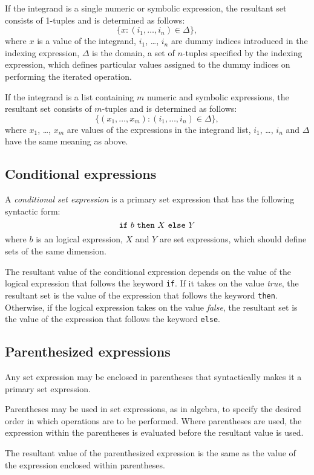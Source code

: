 \documentclass[11pt]{report}
\begin{document}
If the integrand is a single numeric or symbolic expression, the
resultant set consists of 1-tuples and is determined as follows:
$$\{x:(i_1,\dots,i_n)\in\Delta\},$$
\noindent where $x$ is a value of the integrand, $i_1$, \dots, $i_n$
are dummy indices introduced in the indexing expression, $\Delta$ is
the domain, a set of $n$-tuples specified by the indexing expression,
which defines particular values assigned to the dummy indices on
performing the iterated operation.

If the integrand is a list containing $m$ numeric and symbolic
expressions, the resultant set consists of $m$-tuples and is determined
as follows:
$$\{(x_1,\dots,x_m):(i_1,\dots,i_n)\in\Delta\},$$
where $x_1$, \dots, $x_m$ are values of the expressions in the
integrand list, $i_1$, \dots, $i_n$ and $\Delta$ have the same meaning
as above.

\subsection{Conditional expressions}

A {\it conditional set expression} is a primary set expression that has
the following syntactic form:
$$\mbox{{\tt if} $b$ {\tt then} $X$ {\tt else} $Y$}$$
where $b$ is an logical expression, $X$ and $Y$ are set expressions,
which should define sets of the same dimension.

The resultant value of the conditional expression depends on the value
of the logical expression that follows the keyword {\tt if}. If it
takes on the value {\it true}, the resultant set is the value of the
expression that follows the keyword {\tt then}. Otherwise, if the
logical expression takes on the value {\it false}, the resultant set is
the value of the expression that follows the keyword {\tt else}.

\subsection{Parenthesized expressions}

Any set expression may be enclosed in parentheses that syntactically
makes it a primary set expression.

Parentheses may be used in set expressions, as in algebra, to specify
the desired order in which operations are to be performed. Where
parentheses are used, the expression within the parentheses is
evaluated before the resultant value is used.

The resultant value of the parenthesized expression is the same as the
value of the expression enclosed within parentheses.
\end{document}
